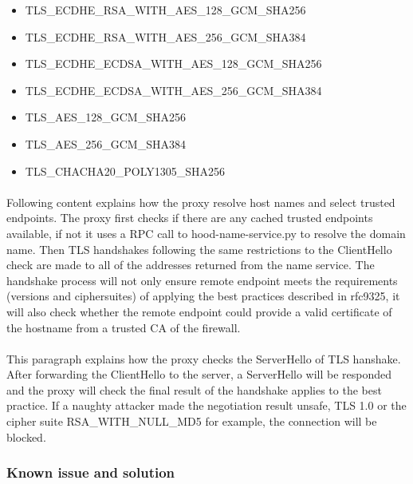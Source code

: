 \documentclass[mscthesis]{usiinfthesis}
\begin{document}
\begin{itemlist}[H]
  \begin{itemize}
    \item TLS\_ECDHE\_RSA\_WITH\_AES\_128\_GCM\_SHA256
    \item TLS\_ECDHE\_RSA\_WITH\_AES\_256\_GCM\_SHA384
    \item TLS\_ECDHE\_ECDSA\_WITH\_AES\_128\_GCM\_SHA256
    \item TLS\_ECDHE\_ECDSA\_WITH\_AES\_256\_GCM\_SHA384
    \item TLS\_AES\_128\_GCM\_SHA256
    \item TLS\_AES\_256\_GCM\_SHA384
    \item TLS\_CHACHA20\_POLY1305\_SHA256
  \end{itemize}
  \label{lst:tls-ciphersuites}
\end{itemlist}

\paragraph{}
Following content explains how the proxy resolve host names and select trusted endpoints. The proxy first checks if there are any cached trusted endpoints available, if not it uses a RPC call to hood-name-service.py to resolve the domain name. Then TLS handshakes following the same restrictions to the ClientHello check are made to all of the addresses returned from the name service. The handshake process will not only ensure remote endpoint meets the requirements (versions and ciphersuites) of applying the best practices described in rfc9325, it will also check whether the remote endpoint could provide a valid certificate of the hostname from a trusted CA of the firewall.
\paragraph{}
This paragraph explains how the proxy checks the ServerHello of TLS hanshake. After forwarding the ClientHello to the server, a ServerHello will be responded and the proxy will check the final result of the handshake applies to the best practice. If a naughty attacker made the negotiation result unsafe, TLS 1.0 or the cipher suite RSA\_WITH\_NULL\_MD5 for example, the connection will be blocked.

\subsubsection{Known issue and solution}
\end{document}
